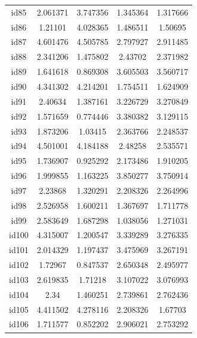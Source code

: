 \documentclass[entropy,article,submit,moreauthors,LaTeX and dvi2pdf]{Definitions/mdpi}
\begin{document}
\begin{center}
\begin{longtable}{ccccc}
id85      & 2.061371  & 3.747356       & 1.345364          & 1.317666          \\
id86      & 1.21101   & 4.028365       & 1.486511          & 1.50695           \\
id87      & 4.601476  & 4.505785       & 2.797927          & 2.911485          \\
id88      & 2.341206  & 1.475802       & 2.43702           & 2.371982          \\
id89      & 1.641618  & 0.869308       & 3.605503          & 3.560717          \\
id90      & 4.341302  & 4.214201       & 1.754511          & 1.624909          \\
id91      & 2.40634   & 1.387161       & 3.226729          & 3.270849          \\
id92      & 1.571659  & 0.774446       & 3.380382          & 3.129115          \\
id93      & 1.873206  & 1.03415        & 2.363766          & 2.248537          \\
id94      & 4.501001  & 4.184188       & 2.48258           & 2.535571          \\
id95      & 1.736907  & 0.925292       & 2.173486          & 1.910205          \\
id96      & 1.999855  & 1.163225       & 3.850277          & 3.750914          \\
id97      & 2.23868   & 1.320291       & 2.208326          & 2.264996          \\
id98      & 2.526958  & 1.600211       & 1.367697          & 1.711778          \\
id99      & 2.583649  & 1.687298       & 1.038056          & 1.271031          \\
id100     & 4.315007  & 1.200547       & 3.339289          & 3.276335          \\
id101     & 2.014329  & 1.197437       & 3.475969          & 3.267191          \\
id102     & 1.72967   & 0.847537       & 2.650348          & 2.495977          \\
id103     & 2.619835  & 1.71218        & 3.107022          & 3.076993          \\
id104     & 2.34      & 1.460251       & 2.739861          & 2.762436          \\
id105     & 4.411502  & 4.278116       & 2.208326          & 1.67703           \\
id106     & 1.711577  & 0.852202       & 2.906021          & 2.753292          \\

\end{longtable}
\end{center}
\end{document}

